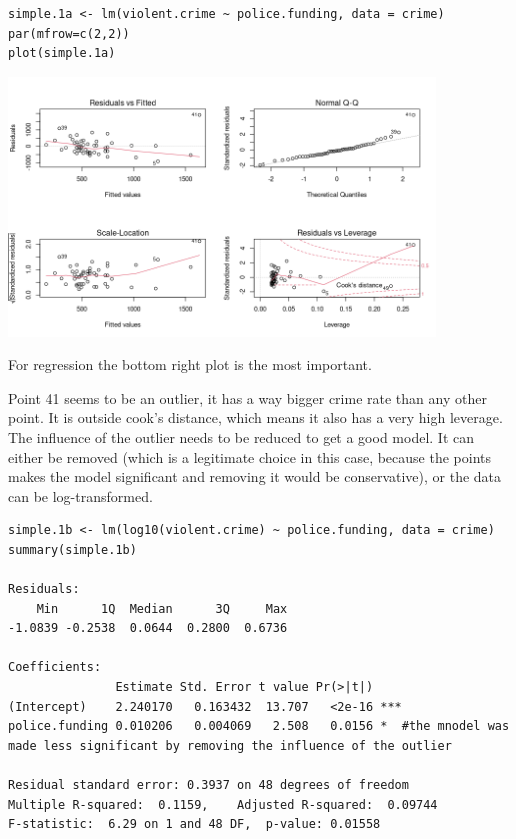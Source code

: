 \documentclass{article}
\begin{document}
\begin{lstlisting}
simple.1a <- lm(violent.crime ~ police.funding, data = crime)
par(mfrow=c(2,2)) 
plot(simple.1a)
\end{lstlisting}

\begin{center}
\includegraphics[width = 0.85\textwidth]{lab3/plot-vcrime-vs-police.png}
\end{center}


For regression the bottom right plot is the most important.\par 
Point 41 seems to be an outlier, it has a way bigger crime rate than any other point. It is outside cook's distance, which means it also has a very high leverage. The influence of the outlier needs to be reduced to get a good model. It can either be removed (which is a legitimate choice in this case, because the points makes the model significant and removing it would be conservative), or the data can be log-transformed.

\begin{lstlisting}
simple.1b <- lm(log10(violent.crime) ~ police.funding, data = crime)
summary(simple.1b)

Residuals:
    Min      1Q  Median      3Q     Max 
-1.0839 -0.2538  0.0644  0.2800  0.6736 

Coefficients:
               Estimate Std. Error t value Pr(>|t|)    
(Intercept)    2.240170   0.163432  13.707   <2e-16 ***
police.funding 0.010206   0.004069   2.508   0.0156 *  #the mnodel was made less significant by removing the influence of the outlier 

Residual standard error: 0.3937 on 48 degrees of freedom
Multiple R-squared:  0.1159,	Adjusted R-squared:  0.09744 
F-statistic:  6.29 on 1 and 48 DF,  p-value: 0.01558
\end{lstlisting}
\end{document}
